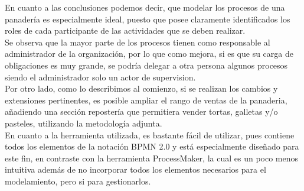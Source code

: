 En cuanto a las conclusiones podemos decir, que modelar los procesos de una panadería es especialmente ideal, puesto que posee claramente identificados los roles de cada participante de las actividades que se deben realizar.\\
Se observa que la mayor parte de los procesos tienen como responsable al administrador de la organización, por lo que como mejora, si es que su carga de obligaciones es muy grande, se podría delegar a otra persona algunos procesos siendo el administrador solo un actor de supervision.\\
Por otro lado, como lo describimos al comienzo, si se realizan los cambios y extensiones pertinentes, es posible ampliar el rango de ventas de la panaderia, añadiendo una sección repostería que permitiera vender tortas, galletas y/o pasteles, utilizando la metodología adjunta.\\
En cuanto a la herramienta utilizada, es bastante fácil de utilizar, pues contiene todos los elementos de la notación BPMN 2.0 y está especialmente diseñado para este fin, en contraste con la herramienta ProcessMaker, la cual es un poco menos intuitiva además de no incorporar todos los elementos necesarios para el modelamiento, pero si para gestionarlos.